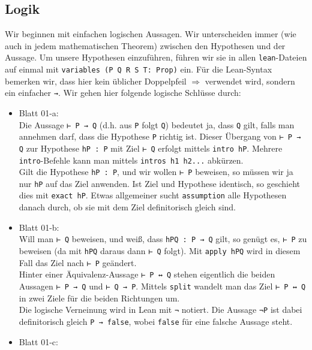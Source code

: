 \documentclass[11pt]{article}
\newcommand{\leanin}{\texttt}
\newcommand{\leanstate}{\texttt}
\begin{document}
\subsection{Logik}
Wir beginnen mit einfachen logischen Aussagen. Wir unterscheiden immer (wie auch in jedem mathematischen Theorem) zwischen den Hypothesen und der Aussage. Um unsere Hypothesen einzuführen, führen wir sie in allen \leanstate{lean}-Dateien auf einmal mit \leanin{variables (P Q R S T: Prop)} ein. Für die Lean-Syntax bemerken wir, dass hier kein üblicher Doppelpfeil $\Longrightarrow$ verwendet wird, sondern ein einfacher \leanstate{→}. Wir gehen hier folgende logische Schlüsse durch:
\begin{itemize}
\item Blatt 01-a: \\
  Die Aussage \leanstate{⊢ P → Q} (d.h. aus \leanstate{P} folgt \leanstate{Q}) bedeutet ja, dass \leanstate{Q} gilt, falls man annehmen darf, dass die Hypothese \leanstate{P} richtig ist. Dieser Übergang von \leanstate{⊢ P → Q} zur Hypothese \leanstate{hP : P} mit Ziel \leanstate{⊢ Q} erfolgt mittels \leanin{intro hP}. Mehrere \leanstate{intro}-Befehle kann man mittels \leanstate{intros h1 h2...} abkürzen.
  \\
  Gilt die Hypothese \leanstate{hP : P}, und wir wollen \leanstate{⊢ P} beweisen, so müssen wir ja nur \leanstate{hP} auf das Ziel anwenden. Ist Ziel und Hypothese identisch, so geschieht dies mit \leanin{exact hP}. Etwas allgemeiner sucht \leanin{assumption} alle Hypothesen danach durch, ob sie mit dem Ziel definitorisch gleich sind. 
\item Blatt 01-b: \\
  Will man \leanstate{⊢ Q} beweisen, und weiß, dass \leanstate{hPQ : P → Q} gilt, so genügt es, \leanstate{⊢ P} zu beweisen (da mit \leanstate{hPQ} daraus dann \leanstate{⊢ Q} folgt). Mit \leanin{apply hPQ} wird in diesem Fall das Ziel nach \leanstate{⊢ P} geändert. \\
  Hinter einer Äquivalenz-Aussage \leanstate{⊢ P ↔ Q} stehen eigentlich die beiden Aussagen \leanstate{⊢ P → Q} und  \leanstate{⊢ Q → P}. Mittels \leanin{split} wandelt man das Ziel \leanstate{⊢ P ↔ Q} in zwei Ziele für die beiden Richtungen um. \\
  Die logische Verneinung wird in Lean mit \leanstate{¬} notiert. Die Aussage \leanstate{¬P} ist dabei definitorisch gleich \leanstate{P → false}, wobei \leanstate{false} für eine falsche Aussage steht.   
\item Blatt 01-c: \\


\end{itemize}
\end{document}
